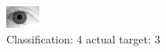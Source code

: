 \begin{figure}[h!]
\begin{center}
\includegraphics[width=0.60\columnwidth]{figures/ID2154_class_4_target_3.png}
\end{center}
\caption{ Classification: 4 actual target: 3}
\label{fig:ID2154_class_4_target_3}
\end{figure}
